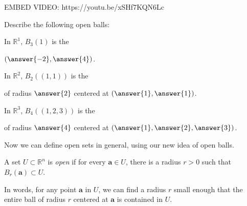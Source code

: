 \documentclass{ximera}
\begin{document}
\begin{foldable}
\begin{example}
\begin{minipage}{.5\textwidth}
\end{minipage}
\begin{minipage}{.5\textwidth}
EMBED VIDEO: https://youtu.be/xSHf7KQN6Lc
\end{minipage}
\end{example}
\end{foldable}

\begin{foldable}
\begin{problem}
Describe the following open balls:

In $\mathbb{R}^1$, $B_3(1)$ is the \begin{multipleChoice}
\end{multipleChoice}  $(\answer{-2},\answer{4})$.
 
 In $\mathbb{R}^2$, $B_2((1,1))$ is the \begin{multipleChoice}
\end{multipleChoice} of radius $\answer{2}$ centered at $(\answer{1}, \answer{1})$.

In $\mathbb{R}^3$, $B_4((1,2,3))$ is the \begin{multipleChoice}
\end{multipleChoice} of radius $\answer{4}$ centered at $(\answer{1}, \answer{2}, \answer{3})$.
\end{problem}
\end{foldable}

Now we can define open sets in general, using our new idea of open balls.

\begin{definition}
A set $U\subset \mathbb{R}^n$ is \emph{open} if for every $\mathbf{a}\in U$, there is a radius $r>0$ such that $B_r(\mathbf{a})\subset U$.
\end{definition}

In words, for any point $\mathbf{a}$ in $U$, we can find a radius $r$ small enough that the entire ball of radius $r$ centered at $\mathbf{a}$ is contained in $U$.
\end{document}
